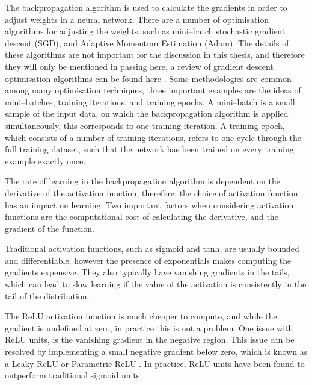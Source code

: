 The backpropagation algorithm is used to calculate the gradients in order to
adjust weights in a neural network. There are a number of optimisation 
algorithms for adjusting the weights, such as mini--batch stochastic gradient 
descent (SGD)\cite{10.1145/2623330.2623612}, and Adaptive Momentum Estimation 
(Adam)\cite{KingmaD.P.2015AAMf}. The details of these algorithms are not 
important for the discussion in this thesis, and therefore they will only be 
mentioned in passing here, a review of gradient descent optimisation 
algorithms can be found here \cite{ruder2016overview}. Some methodologies are
common among many optimisation techniques, three important examples are the 
ideas of mini--batches, training iterations, and training epochs. A mini--batch
is a small sample of the input data, on which the backpropagation algorithm is
applied simultaneously, this corresponds to one training iteration. A training
epoch, which consists of a number of training iterations, refers to one cycle
through the full training dataset, such that the network has been trained on 
every training example exactly once.

\bigskip

The rate of learning in the backpropagation algorithm is dependent on the
derivative of the activation function, therefore, the choice of activation
function has an impact on learning. Two important factors when considering
activation functions are the computational cost of calculating the derivative,
and the gradient of the function. 

Traditional activation functions, such as sigmoid and tanh, are usually 
bounded and differentiable, however the presence of exponentials makes 
computing the gradients expensive. They also typically have vanishing 
gradients in the tails, which can lead to slow learning if the value of the 
activation is consistently in the tail of the distribution. 

The ReLU activation function is much cheaper to compute, and while the 
gradient is undefined at zero, in practice this is not a problem. One issue 
with ReLU units, is the vanishing gradient in the negative region. This issue 
can be resolved by implementing a small negative gradient below zero, which is 
known as a Leaky ReLU or Parametric ReLU \cite{He2015}. In practice, ReLU 
units have been found to outperform traditional sigmoid 
units\cite{Maas13rectifiernonlinearities, 10.5555/3104322.3104425}.


